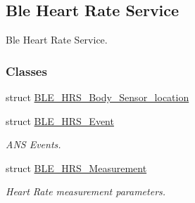 \hypertarget{group___b_l_e___h_r_s}{}\subsection{Ble Heart Rate Service}
\label{group___b_l_e___h_r_s}


Ble Heart Rate Service.  


\subsubsection*{Classes}
\begin{DoxyCompactItemize}
\item 
struct \hyperlink{struct_b_l_e___h_r_s___body___sensor__location}{B\+L\+E\+\_\+\+H\+R\+S\+\_\+\+Body\+\_\+\+Sensor\+\_\+location}
\item 
struct \hyperlink{struct_b_l_e___h_r_s___event}{B\+L\+E\+\_\+\+H\+R\+S\+\_\+\+Event}
\begin{DoxyCompactList}\small\item\em A\+NS Events. \end{DoxyCompactList}\item 
struct \hyperlink{struct_b_l_e___h_r_s___measurement}{B\+L\+E\+\_\+\+H\+R\+S\+\_\+\+Measurement}
\begin{DoxyCompactList}\small\item\em Heart Rate measurement parameters. \end{DoxyCompactList}\end{DoxyCompactItemize}

